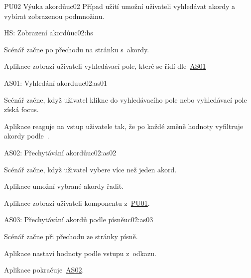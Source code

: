 \begin{usecase}{PU02 Výuka akordů}{uc02}
    Případ užití umožní uživateli vyhledávat akordy a vybírat zobrazenou podmnožinu.

    \begin{scenario}{HS: Zobrazení akordů}{uc02:hs}
        \item Scénář začne po přechodu na stránku s~akordy.
        \item Aplikace zobrazí uživateli vyhledávací pole, které se řídí dle~\hyperref[uc02:as01]{AS01}
    \end{scenario}

    \begin{scenario}{AS01: Vyhledání akordu}{uc02:as01}
        \item Scénář začne, když uživatel klikne do vyhledávacího pole nebo vyhledávací pole získá focus.
        \item Aplikace reaguje na vstup uživatele tak, že po každé změně hodnoty vyfiltruje akordy podle~.
    \end{scenario}

    \begin{scenario}{AS02: Přechytávání akordů}{uc02:as02}
        \item Scénář začne, když uživatel vybere více než jeden akord.
        \item Aplikace umožní vybrané akordy řadit.
        \item Aplikace zobrazí uživateli komponentu z~\hyperref[uc01]{PU01}.
    \end{scenario}

    \begin{scenario}{AS03: Přechytávání akordů podle písně}{uc02:as03}
        \item Scénář začne při přechodu ze stránky písně.
        \item Aplikace nastaví hodnoty podle vstupu z~odkazu.
        \item Aplikace pokračuje~\hyperref[uc02:as02]{AS02}.
    \end{scenario}



\end{usecase}
